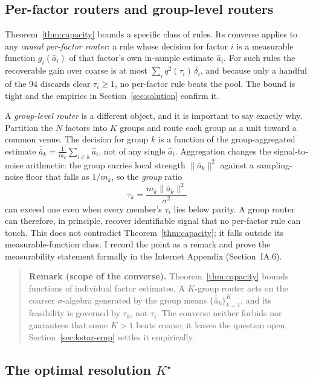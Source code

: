 \documentclass[12pt]{article}
\theoremstyle{plain}
\theoremstyle{definition}
\begin{document}
\subsection{Per-factor routers and group-level routers}
\label{sec:kstar-boundary}

Theorem~\ref{thm:capacity} bounds a specific class of rules. Its converse applies
to any \emph{causal per-factor router}: a rule whose decision for factor $i$ is a
measurable function $g_i(\hat a_i)$ of that factor's own in-sample estimate
$\hat a_i$. For such rules the recoverable gain over coarse is at most
$\sum_i q^2(\tau_i)\,\delta_i$, and because only a handful of the $94$ discards
clear $\tau_i\ge 1$, no per-factor rule beats the pool. The bound is tight and the
empirics in Section~\ref{sec:solution} confirm it.

A \emph{group-level router} is a different object, and it is important to say
exactly why. Partition the $N$ factors into $K$ groups and route each group as a
unit toward a common venue. The decision for group $k$ is a function of the
group-aggregated estimate $\hat{\bar a}_k=\tfrac1{m_k}\sum_{i\in k}\hat a_i$, not
of any single $\hat a_i$. Aggregation changes the signal-to-noise arithmetic: the
group carries local strength $\lVert\bar a_k\rVert^2$ against a sampling-noise
floor that falls as $1/m_k$, so the \emph{group} ratio
\[
\tau_k=\frac{m_k\lVert\bar a_k\rVert^2}{\sigma^2}
\]
can exceed one even when every member's $\tau_i$ lies below parity. A group
router can therefore, in principle, recover identifiable signal that no
per-factor rule can touch. This does not contradict Theorem~\ref{thm:capacity};
it falls outside its measurable-function class. I record the point as a remark
and prove the measurability statement formally in the Internet Appendix
(Section~IA.6).

\begin{quote}\small
\textbf{Remark (scope of the converse).} Theorem~\ref{thm:capacity} bounds
functions of individual factor estimates. A $K$-group router acts on the
coarser $\sigma$-algebra generated by the group means
$\{\hat{\bar a}_k\}_{k=1}^K$, and its feasibility is governed by $\tau_k$, not
$\tau_i$. The converse neither forbids nor guarantees that some $K>1$ beats
coarse; it leaves the question open. Section~\ref{sec:kstar-emp} settles it
empirically.
\end{quote}
\subsection{The optimal resolution $K^\star$}
\label{sec:kstar-def}
\end{document}
